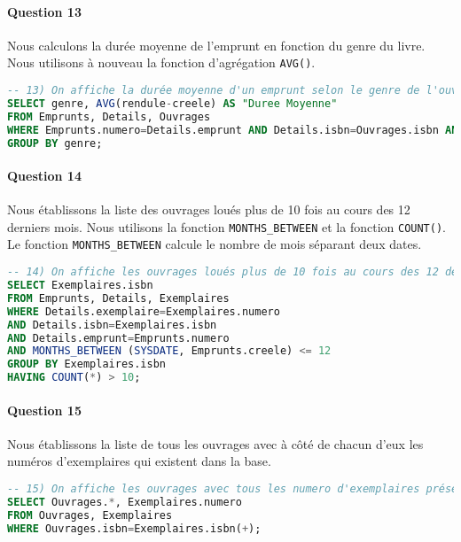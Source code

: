 \documentclass[10pt, oneside]{article}
\begin{document}

\paragraph{Question 13} Nous calculons la durée moyenne de l'emprunt en fonction du genre du livre. Nous utilisons à nouveau la fonction d'agrégation \texttt{AVG()}.

\begin{lstlisting}[language=sql, title=Question 13, label=QII13]
-- 13) On affiche la durée moyenne d'un emprunt selon le genre de l'ouvrage
SELECT genre, AVG(rendule-creele) AS "Duree Moyenne"
FROM Emprunts, Details, Ouvrages
WHERE Emprunts.numero=Details.emprunt AND Details.isbn=Ouvrages.isbn AND rendule IS NOT NULL
GROUP BY genre;
\end{lstlisting}


\paragraph{Question 14} Nous établissons la liste des ouvrages loués plus de 10 fois au cours des 12 derniers mois. Nous utilisons la fonction \texttt{MONTHS\_BETWEEN} et la fonction \texttt{COUNT()}. Le fonction \texttt{MONTHS\_BETWEEN} calcule le nombre de mois séparant deux dates.

\begin{lstlisting}[language=sql, title=Question 14, label=QII14]
-- 14) On affiche les ouvrages loués plus de 10 fois au cours des 12 derniers mois
SELECT Exemplaires.isbn
FROM Emprunts, Details, Exemplaires
WHERE Details.exemplaire=Exemplaires.numero
AND Details.isbn=Exemplaires.isbn
AND Details.emprunt=Emprunts.numero
AND MONTHS_BETWEEN (SYSDATE, Emprunts.creele) <= 12
GROUP BY Exemplaires.isbn
HAVING COUNT(*) > 10;
\end{lstlisting}


\paragraph{Question 15} Nous établissons la liste de tous les ouvrages avec à côté de chacun d'eux les numéros d'exemplaires qui existent dans la base.

\begin{lstlisting}[language=sql, title=Question 15, label=QII15]
-- 15) On affiche les ouvrages avec tous les numero d'exemplaires présents dans la base
SELECT Ouvrages.*, Exemplaires.numero
FROM Ouvrages, Exemplaires
WHERE Ouvrages.isbn=Exemplaires.isbn(+);
\end{lstlisting}
\end{document}
